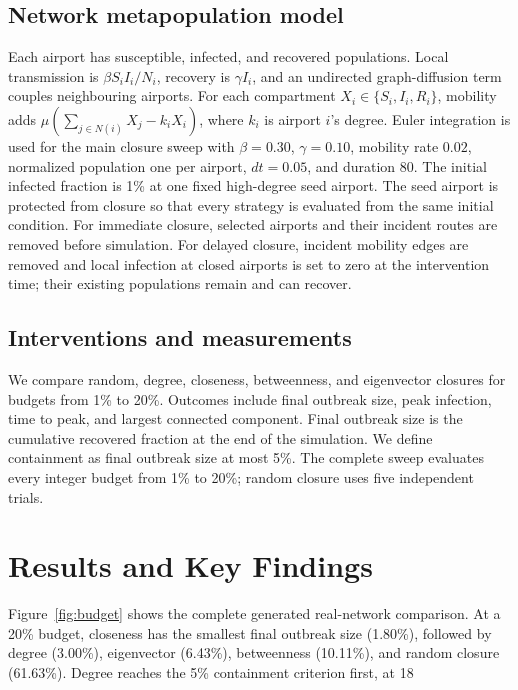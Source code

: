 \documentclass[conference]{IEEEtran}
\begin{document}
\subsection{Network metapopulation model}
Each airport has susceptible, infected, and recovered populations. Local transmission is $\beta S_iI_i/N_i$, recovery is $\gamma I_i$, and an undirected graph-diffusion term couples neighbouring airports. For each compartment $X_i\in\{S_i,I_i,R_i\}$, mobility adds $\mu\left(\sum_{j\in N(i)}X_j-k_iX_i\right)$, where $k_i$ is airport $i$'s degree. Euler integration is used for the main closure sweep with $\beta=0.30$, $\gamma=0.10$, mobility rate $0.02$, normalized population one per airport, $dt=0.05$, and duration 80. The initial infected fraction is 1\% at one fixed high-degree seed airport. The seed airport is protected from closure so that every strategy is evaluated from the same initial condition. For immediate closure, selected airports and their incident routes are removed before simulation. For delayed closure, incident mobility edges are removed and local infection at closed airports is set to zero at the intervention time; their existing populations remain and can recover.

\subsection{Interventions and measurements}
We compare random, degree, closeness, betweenness, and eigenvector closures for budgets from 1\% to 20\%. Outcomes include final outbreak size, peak infection, time to peak, and largest connected component. Final outbreak size is the cumulative recovered fraction at the end of the simulation. We define containment as final outbreak size at most 5\%. The complete sweep evaluates every integer budget from 1\% to 20\%; random closure uses five independent trials.

\section{Results and Key Findings}
Figure~\ref{fig:budget} shows the complete generated real-network comparison. At a 20\% budget, closeness has the smallest final outbreak size (1.80\%), followed by degree (3.00\%), eigenvector (6.43\%), betweenness (10.11\%), and random closure (61.63\%). Degree reaches the 5\% containment criterion first, at 18%
\end{document}
